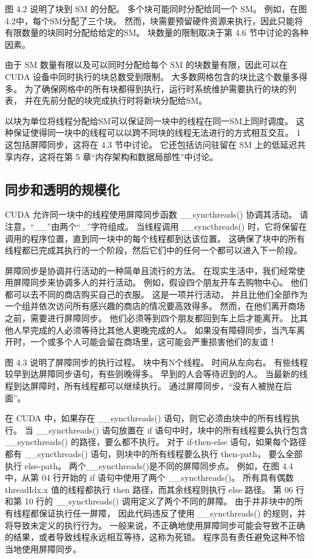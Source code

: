图 4.2 说明了块到 SM 的分配。 多个块可能同时分配给同一个 SM。 例如，在图4.2中，每个SM分配了三个块。 
然而，块需要预留硬件资源来执行，因此只能将有限数量的块同时分配给给定的SM。 块数量的限制取决于第 4.6 节中讨论的各种因素。

由于 SM 数量有限以及可以同时分配给每个 SM 的块数量有限，因此可以在 CUDA 设备中同时执行的块总数受到限制。 
大多数网格包含的块比这个数量多得多。 为了确保网格中的所有块都得到执行，运行时系统维护需要执行的块的列表，
并在先前分配的块完成执行时将新块分配给SM。

以块为单位将线程分配给SM可以保证同一块中的线程在同一SM上同时调度。 
这种保证使得同一块中的线程可以以跨不同块的线程无法进行的方式相互交互。 1 这包括屏障同步，这将在 4.3 节中讨论。 
它还包括访问驻留在 SM 上的低延迟共享内存，这将在第 5 章“内存架构和数据局部性”中讨论。

\subsection{同步和透明的规模化}
CUDA 允许同一块中的线程使用屏障同步函数 \_\_syncthreads() 协调其活动。 请注意，“\_\_”由两个“\_”字符组成。 
当线程调用 \_\_syncthreads() 时，它将保留在调用的程序位置，直到同一块中的每个线程都到达该位置。 
这确保了块中的所有线程都已完成其执行的一个阶段，然后它们中的任何一个都可以进入下一阶段。

屏障同步是协调并行活动的一种简单且流行的方法。 在现实生活中，我们经常使用屏障同步来协调多人的并行活动。 
例如，假设四个朋友开车去购物中心。 他们都可以去不同的商店购买自己的衣服。 这是一项并行活动，
并且比他们全部作为一个组并依次访问所有感兴趣的商店的情况要高效得多。 然而，在他们离开商场之前，需要进行屏障同步。 
他们必须等到四个朋友都回到车上后才能离开。 比其他人早完成的人必须等待比其他人更晚完成的人。 
如果没有障碍同步，当汽车离开时，一个或多个人可能会留在商场里，这可能会严重损害他们的友谊！

图 4.3 说明了屏障同步的执行过程。 块中有N个线程。 时间从左向右。 有些线程较早到达屏障同步语句，有些则晚得多。 
早到的人会等待迟到的人。 当最新的线程到达屏障时，所有线程都可以继续执行。 通过屏障同步，“没有人被抛在后面”。

在 CUDA 中，如果存在 \_\_syncthreads() 语句，则它必须由块中的所有线程执行。 
当 \_\_syncthreads() 语句放置在 if 语句中时，块中的所有线程要么执行包含 \_\_syncthreads() 的路径，要么都不执行。 
对于 if-then-else 语句，如果每个路径都有 \_\_syncthreads() 语句，则块中的所有线程要么执行 then-path，
要么全部执行 else-path。 两个\_\_syncthreads()是不同的屏障同步点。 
例如，在图 4.4 中，从第 04 行开始的 if 语句中使用了两个 \_\_syncthreads()。
所有具有偶数 threadIdx.x 值的线程都执行 then 路径，而其余线程则执行 else 路径。 
第 06 行和第 10 行的 \_\_syncthreads() 调用定义了两个不同的屏障。 由于并非块中的所有线程都保证执行任一屏障，
因此代码违反了使用 \_\_syncthreads() 的规则，并将导致未定义的执行行为。 
一般来说，不正确地使用屏障同步可能会导致不正确的结果，或者导致线程永远相互等待，这称为死锁。 
程序员有责任避免这种不恰当地使用屏障同步。

